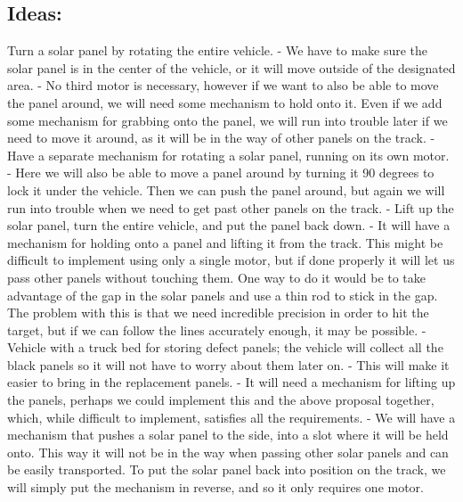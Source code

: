 \subsection{Ideas:}
Turn a solar panel by rotating the entire vehicle. -
We have to make sure the solar panel is in the center of the vehicle, or
it will move outside of the designated area. - No third motor is
necessary, however if we want to also be able to move the panel around,
we will need some mechanism to hold onto it. Even if we add some
mechanism for grabbing onto the panel, we will run into trouble later if
we need to move it around, as it will be in the way of other panels on
the track. - Have a separate mechanism for rotating a solar panel,
running on its own motor. - Here we will also be able to move a panel
around by turning it 90 degrees to lock it under the vehicle. Then we
can push the panel around, but again we will run into trouble when we
need to get past other panels on the track. - Lift up the solar panel,
turn the entire vehicle, and put the panel back down. - It will have a
mechanism for holding onto a panel and lifting it from the track. This
might be difficult to implement using only a single motor, but if done
properly it will let us pass other panels without touching them. One way
to do it would be to take advantage of the gap in the solar panels and
use a thin rod to stick in the gap. The problem with this is that we
need incredible precision in order to hit the target, but if we can
follow the lines accurately enough, it may be possible. - Vehicle with a
truck bed for storing defect panels; the vehicle will collect all the
black panels so it will not have to worry about them later on. - This
will make it easier to bring in the replacement panels. - It will need a
mechanism for lifting up the panels, perhaps we could implement this and
the above proposal together, which, while difficult to implement,
satisfies all the requirements. - We will have a mechanism that pushes a
solar panel to the side, into a slot where it will be held onto. This
way it will not be in the way when passing other solar panels and can be
easily transported. To put the solar panel back into position on the
track, we will simply put the mechanism in reverse, and so it only
requires one motor.

